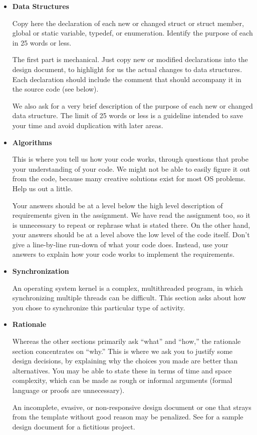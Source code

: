 \begin{itemize}
	\item \textbf{Data Structures}

Copy here the declaration of each new or changed struct or struct member, global or static variable,
typedef, or enumeration. Identify the purpose of each in 25 words or less.

The first part is mechanical. Just copy new or modified declarations into the
design document, to highlight for us the actual changes to data structures. Each
declaration should include the comment that should accompany it in the source
code (see below).

We also ask for a very brief description of the purpose of each new or changed
data structure. The limit of 25 words or less is a guideline intended to save
your time and avoid duplication with later areas.

	\item \textbf{Algorithms}

This is where you tell us how your code works, through questions that probe your understanding of 
your code. We might not be able to easily figure it out from the code, because many creative 
solutions exist for most OS problems. Help us out a little.

Your answers should be at a level below the high level description of requirements given in the 
assignment. We have read the assignment too, so it is unnecessary to repeat or rephrase what is 
stated there. On the other hand, your answers should be at a level above the low level of the code
itself. Don’t give a line-by-line run-down of what your code does. Instead, use your answers to 
explain how your code works to implement the requirements.

	\item \textbf{Synchronization}

An operating system kernel is a complex, multithreaded program, in which
synchronizing multiple threads can be difficult. This section asks about how
you chose to synchronize this particular type of activity.

	\item \textbf{Rationale}

Whereas the other sections primarily ask “what” and “how,” the rationale section concentrates on 
“why.” This is where we ask you to justify some design decisions, by explaining why the choices you 
made are better than alternatives. You may be able to state these in terms of time and space 
complexity, which can be made as rough or informal arguments (formal language or proofs are
unnecessary).

An incomplete, evasive, or non-responsive design document or one that strays from the template 
without good reason may be penalized. See  for a sample design document for a
fictitious project.

\end{itemize}

